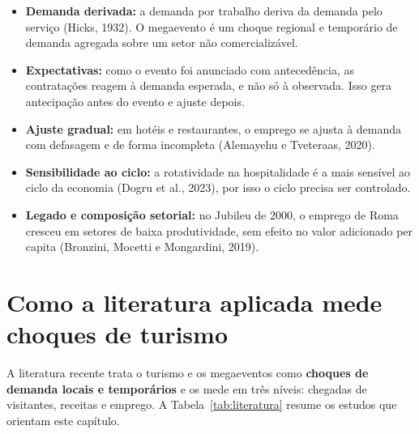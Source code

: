 \begin{itemize}
  \item \textbf{Demanda derivada:} a demanda por trabalho deriva da demanda pelo serviço (Hicks, 1932).
        O megaevento é um choque regional e temporário de demanda agregada sobre um setor não
        comercializável.
  \item \textbf{Expectativas:} como o evento foi anunciado com antecedência, as contratações reagem à
        demanda esperada, e não só à observada. Isso gera antecipação antes do evento e ajuste depois.
  \item \textbf{Ajuste gradual:} em hotéis e restaurantes, o emprego se ajusta à demanda com defasagem e
        de forma incompleta (Alemayehu e Tveteraas, 2020).
  \item \textbf{Sensibilidade ao ciclo:} a rotatividade na hospitalidade é a mais sensível ao ciclo da
        economia (Dogru et al., 2023), por isso o ciclo precisa ser controlado.
  \item \textbf{Legado e composição setorial:} no Jubileu de 2000, o emprego de Roma cresceu em setores
        de baixa produtividade, sem efeito no valor adicionado per capita (Bronzini, Mocetti e
        Mongardini, 2019).
\end{itemize}


\section{Como a literatura aplicada mede choques de turismo}

A literatura recente trata o turismo e os megaeventos como \textbf{choques de demanda locais e
temporários} e os mede em três níveis: chegadas de visitantes, receitas e emprego. A Tabela~\ref{tab:literatura}
resume os estudos que orientam este capítulo.

